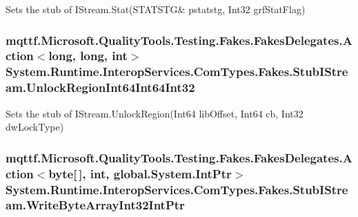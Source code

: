 Sets the stub of I\-Stream.\-Stat(S\-T\-A\-T\-S\-T\-G\& pstatstg, Int32 grf\-Stat\-Flag)

\hypertarget{class_system_1_1_runtime_1_1_interop_services_1_1_com_types_1_1_fakes_1_1_stub_i_stream_a5ee1ca6ad0d490f1c5a3ae3f0003ab89}{
\subsubsection[{Unlock\-Region\-Int64\-Int64\-Int32}]{\setlength{\rightskip}{0pt plus 5cm}mqttf.\-Microsoft.\-Quality\-Tools.\-Testing.\-Fakes.\-Fakes\-Delegates.\-Action$<$long, long, int$>$ System.\-Runtime.\-Interop\-Services.\-Com\-Types.\-Fakes.\-Stub\-I\-Stream.\-Unlock\-Region\-Int64\-Int64\-Int32}}\label{class_system_1_1_runtime_1_1_interop_services_1_1_com_types_1_1_fakes_1_1_stub_i_stream_a5ee1ca6ad0d490f1c5a3ae3f0003ab89}


Sets the stub of I\-Stream.\-Unlock\-Region(\-Int64 lib\-Offset, Int64 cb, Int32 dw\-Lock\-Type)

\hypertarget{class_system_1_1_runtime_1_1_interop_services_1_1_com_types_1_1_fakes_1_1_stub_i_stream_a7f2ba578fdb95e8312daf0d3fbfd29e0}{
\subsubsection[{Write\-Byte\-Array\-Int32\-Int\-Ptr}]{\setlength{\rightskip}{0pt plus 5cm}mqttf.\-Microsoft.\-Quality\-Tools.\-Testing.\-Fakes.\-Fakes\-Delegates.\-Action$<$byte\mbox{[}$\,$\mbox{]}, int, global.\-System.\-Int\-Ptr$>$ System.\-Runtime.\-Interop\-Services.\-Com\-Types.\-Fakes.\-Stub\-I\-Stream.\-Write\-Byte\-Array\-Int32\-Int\-Ptr}}\label{class_system_1_1_runtime_1_1_interop_services_1_1_com_types_1_1_fakes_1_1_stub_i_stream_a7f2ba578fdb95e8312daf0d3fbfd29e0}


